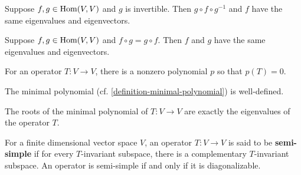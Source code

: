 \documentclass{homework}
\begin{document}
\begin{problem}
  Suppose $f, g \in \operatorname{Hom}(V,V)$ and $g$ is invertible.  Then $g \circ f \circ g^{-1}$ and $f$ have the same eigenvalues and eigenvectors.
\end{problem}

\begin{problem}
  Suppose $f,g \in \operatorname{Hom}(V,V)$ and $f \circ g = g \circ f$.  Then $f$ and $g$ have the same eigenvalues and eigenvectors.
\end{problem}

\begin{problem}\label{every-operator-satisfies-a-polynomial}
  For an operator $T : V \to V$, there is a nonzero polynomial $p$
  so that $p(T) = 0$.
\end{problem}

\begin{problem}
  The minimal polynomial (cf. \ref{definition-minimal-polynomial}) is well-defined.
\end{problem}

\begin{problem}
  The roots of the minimal polynomial of $T : V \to V$ are exactly the
  eigenvalues of the operator $T$.
\end{problem}

\begin{problem}
  For a finite dimensional vector space $V$, an operator $T : V \to V$
  is said to be \textbf{semi-simple} if for every $T$-invariant
  subspace, there is a complementary $T$-invariant subspace.  An
  operator is semi-simple if and only if it is diagonalizable.
\end{problem}
\end{document}
